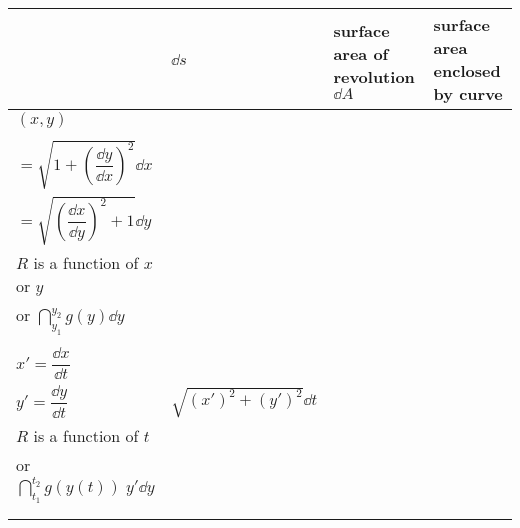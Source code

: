 \begin{center}
\begin{tcolorbox}
    \begin{center}
    \renewcommand{\arraystretch}{6}
    \begin{tabular}{|p{2cm}|p{4.5cm}|p{3.5cm}|p{3.5cm}|} 
        \hline
         & $ \dd s $ & surface area of revolution $ \dd A $ & surface area enclosed by curve\\ 
        \hline
        $ (x,y) $ & \begin{minipage}{4.5cm}
            $\boldsymbol{\sqrt{(\dd x)^2 + (\dd y)^2}}$ \\
            \\
            $= \sqrt{1 + \left(\dfrac{\dd y}{\dd x}\right)^2} \dd x$ \\ 
            $= \sqrt{\left(\dfrac{\dd x}{\dd y}\right)^2 + 1} \dd y$
        \end{minipage} & \begin{minipage}{3.5cm}
            $ \boldsymbol{2\pi R \dd s} $, \\
            $R$ is a function of $x$ or $y$
        \end{minipage}
        & \begin{minipage}{4cm}
            $\dint_{x_1}^{x_2} f(x) \dd x$ \\
            or $\dint_{y_1}^{y_2} g(y) \dd y$
        \end{minipage}\\
        \hline
        \begin{minipage}{2cm}
            $ \big( x(t), y(t) \big) $ \\
            $x' = \dfrac{\dd x}{\dd t}$\\
            $y' = \dfrac{\dd y}{\dd t}$
        \end{minipage}
        & $ \sqrt{(x')^2 + (y')^2} \dd t $ & \begin{minipage}{3.5cm}
            $ 2\pi R \dd s $, \\
            $R$ is a function of $t$
        \end{minipage} & \begin{minipage}{4cm}
            $\dint_{t_1}^{t_2} f(x(t)) \; x'\dd t$ \\
            or $\dint_{t_1}^{t_2} g(y(t)) \; y'\dd y$
        \end{minipage} \\
        \hline
        \begin{minipage}{2cm}
            $ (r,\theta)$, \\

\end{minipage}
\end{tabular}
\end{center}
\end{tcolorbox}
\end{center}
